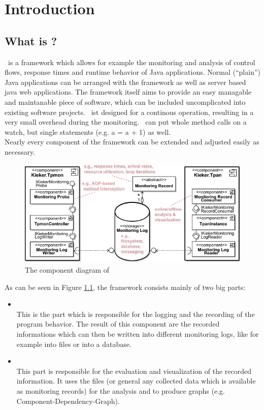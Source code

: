 \chapter{Introduction}
  \section{What is \Kieker?}
    \Kieker\ is a framework which allows for example the monitoring and analysis of control flows, response times and runtime behavior of Java applications. Normal (``plain'') Java applications can be arranged with the framework as well as server based java web applications. The framework itself aims to provide an easy managable and maintanable piece of software, which can be included uncomplicated into existing software projects. \Kieker\ ist designed for a continous operation, resulting in a very small overhead during the monitoring. \Kieker\ can put whole method calls on a watch, but single statements (e.g. a = a + 1) as well.\\
    Nearly every component of the framework can be extended and adjusted easily as necessary.
    \begin{figure}[H]
      \begin{center}
	\includegraphics[width=1.0\textwidth]{./images/kiekerComponentDiagram.pdf}
	\caption{The component diagram of \Kieker}
	\label{image:kiekercomponentdiagram}
      \end{center}
    \end{figure}
    As can be seen in Figure \ref{image:kiekercomponentdiagram}, the framework consists mainly of two big parts:
    \begin{itemize}
      \item \textbf{\KiekerMonitoring}\\
	This is the part which is responsible for the logging and the recording of the program behavior. The result of this component are the recorded informations which can then be written into different monitoring logs, like for example into files or into a database.
      \item \textbf{\KiekerAnalysis}\\
	This part is responsible for the evaluation and visualization of the recorded information. It uses the files (or general any collected data which is available as monitoring records) for the analysis and to produce graphs (e.g. Component-Dependency-Graph).
    \end{itemize}
